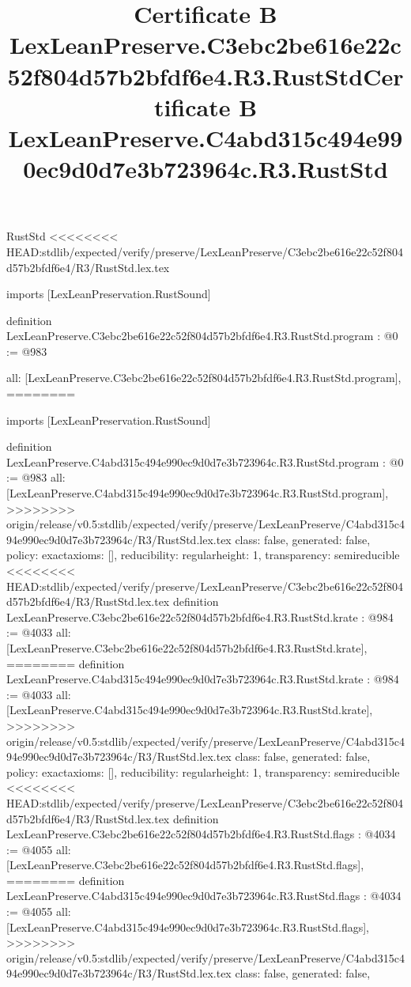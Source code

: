 \begin{lexlean}{RustStd}
<<<<<<<< HEAD:stdlib/expected/verify/preserve/LexLeanPreserve/C3ebc2be616e22c52f804d57b2bfdf6e4/R3/RustStd.lex.tex
\title{Certificate B LexLeanPreserve.C3ebc2be616e22c52f804d57b2bfdf6e4.R3.RustStd}
\begin{coremodule}
imports [LexLeanPreservation.RustSound]

definition LexLeanPreserve.C3ebc2be616e22c52f804d57b2bfdf6e4.R3.RustStd.program : @0 := @983 {
  all: [LexLeanPreserve.C3ebc2be616e22c52f804d57b2bfdf6e4.R3.RustStd.program],
========
\title{Certificate B LexLeanPreserve.C4abd315c494e990ec9d0d7e3b723964c.R3.RustStd}
\begin{coremodule}
imports [LexLeanPreservation.RustSound]

definition LexLeanPreserve.C4abd315c494e990ec9d0d7e3b723964c.R3.RustStd.program : @0 := @983 {
  all: [LexLeanPreserve.C4abd315c494e990ec9d0d7e3b723964c.R3.RustStd.program],
>>>>>>>> origin/release/v0.5:stdlib/expected/verify/preserve/LexLeanPreserve/C4abd315c494e990ec9d0d7e3b723964c/R3/RustStd.lex.tex
  class: false,
  generated: false,
  policy: exact{axioms: []},
  reducibility: regular{height: 1},
  transparency: semireducible
}
<<<<<<<< HEAD:stdlib/expected/verify/preserve/LexLeanPreserve/C3ebc2be616e22c52f804d57b2bfdf6e4/R3/RustStd.lex.tex
definition LexLeanPreserve.C3ebc2be616e22c52f804d57b2bfdf6e4.R3.RustStd.krate : @984 := @4033 {
  all: [LexLeanPreserve.C3ebc2be616e22c52f804d57b2bfdf6e4.R3.RustStd.krate],
========
definition LexLeanPreserve.C4abd315c494e990ec9d0d7e3b723964c.R3.RustStd.krate : @984 := @4033 {
  all: [LexLeanPreserve.C4abd315c494e990ec9d0d7e3b723964c.R3.RustStd.krate],
>>>>>>>> origin/release/v0.5:stdlib/expected/verify/preserve/LexLeanPreserve/C4abd315c494e990ec9d0d7e3b723964c/R3/RustStd.lex.tex
  class: false,
  generated: false,
  policy: exact{axioms: []},
  reducibility: regular{height: 1},
  transparency: semireducible
}
<<<<<<<< HEAD:stdlib/expected/verify/preserve/LexLeanPreserve/C3ebc2be616e22c52f804d57b2bfdf6e4/R3/RustStd.lex.tex
definition LexLeanPreserve.C3ebc2be616e22c52f804d57b2bfdf6e4.R3.RustStd.flags : @4034 := @4055 {
  all: [LexLeanPreserve.C3ebc2be616e22c52f804d57b2bfdf6e4.R3.RustStd.flags],
========
definition LexLeanPreserve.C4abd315c494e990ec9d0d7e3b723964c.R3.RustStd.flags : @4034 := @4055 {
  all: [LexLeanPreserve.C4abd315c494e990ec9d0d7e3b723964c.R3.RustStd.flags],
>>>>>>>> origin/release/v0.5:stdlib/expected/verify/preserve/LexLeanPreserve/C4abd315c494e990ec9d0d7e3b723964c/R3/RustStd.lex.tex
  class: false,
  generated: false,
}}}
\end{coremodule}}
\end{coremodule}
\end{lexlean}
